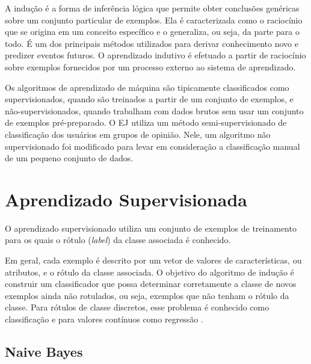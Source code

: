 A indução é a forma de inferência lógica que permite obter conclusões genéricas sobre um conjunto particular de exemplos. 
Ela é caracterizada como o raciocínio que se origina em um conceito específico e o generaliza, ou seja, da parte para o todo. É um dos principais métodos utilizados para derivar conhecimento novo e predizer eventos futuros. O aprendizado indutivo é efetuado a partir de raciocínio sobre exemplos fornecidos por um processo externo ao sistema de aprendizado.

Os algoritmos de aprendizado de máquina são tipicamente classificados como supervisionados, quando são treinados a partir de um conjunto de exemplos, e não-supervisionados, quando trabalham com dados brutos sem usar um conjunto de exemplos pré-preparado.
O EJ utiliza um método semi-supervisionado de classificação dos usuários em grupos de opinião. Nele, um algoritmo não supervisionado foi modificado para levar em consideração a classificação manual de um pequeno conjunto de dados.



\section{Aprendizado Supervisionada}


O aprendizado supervisionado utiliza um conjunto de exemplos de treinamento para os quais o rótulo (\textit{label}) da classe associada é conhecido.

Em geral, cada exemplo é descrito por um vetor de valores de características, ou atributos, e o rótulo da classe associada. O objetivo do algoritmo de indução é construir um classificador que possa determinar corretamente a classe de novos exemplos ainda não rotulados, ou seja, exemplos que não tenham o rótulo da classe. Para rótulos de classe discretos, esse problema é conhecido como classificação e para valores contínuos como regressão \cite{monard2003}. 


\subsection{Naive Bayes}


